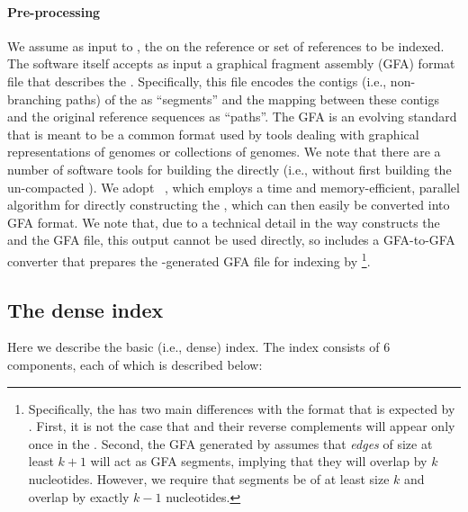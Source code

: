 \paragraph*{Pre-processing} We assume as input to \pufferfish, the \ccdbg on the reference
or set of references to be indexed. The \pufferfish software itself accepts as input
a graphical fragment assembly (GFA) format file that describes the \ccdbg.
Specifically, this file encodes the contigs (i.e., non-branching paths) of the
\ccdbg as ``segments'' and the mapping between these contigs and the original
reference sequences as ``paths''.  The GFA is an evolving standard that is meant
to be a common format used by tools dealing with graphical representations of
genomes or collections of genomes. We note that there are a number of software
tools for building the \ccdbg directly (i.e., without first building the
un-compacted \dbg). We adopt \twopaco~\cite{minkin2016twopaco}, which employs a
time and memory-efficient, parallel algorithm for directly constructing the
\ccdbg, which can then easily be converted into GFA format. We note that, due to
a technical detail in the way \twopaco constructs the \ccdbg and the GFA file,
this output cannot be used directly, so \pufferfish includes a GFA-to-GFA converter
that prepares the \twopaco-generated GFA file for indexing by
\pufferfish\footnote{Specifically, the \twopaco \ccdbg has two main differences with
  the format that is expected by \pufferfish. First, it is not the case that \kmers
  and their reverse complements will appear only once in the \twopaco \ccdbg.
  Second, the GFA generated by \twopaco assumes that \emph{edges} of size at
  least $k+1$ will act as GFA segments, implying that they will overlap by $k$
  nucleotides. However, we require that segments be of at least size $k$ and
  overlap by exactly $k-1$ nucleotides.}.

\subsection*{The dense \pufferfish index}

Here we describe the basic (i.e., dense) \pufferfish index. The index consists of 6
components, each of which is described below:

